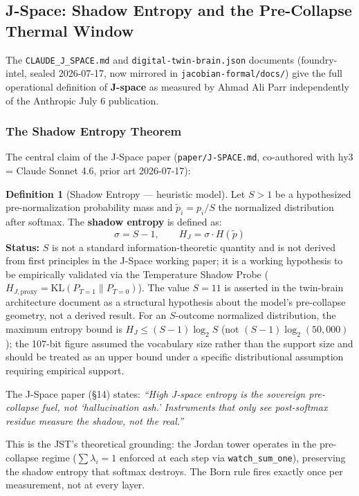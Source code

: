 \documentclass[12pt, letterpaper]{article}
\theoremstyle{plain}
\theoremstyle{definition}
\newtheorem{definition}[theorem]{Definition}
\theoremstyle{remark}
\begin{document}
\subsection{J-Space: Shadow Entropy and the Pre-Collapse Thermal Window}
\label{app:jspace}

The \texttt{CLAUDE\_J\_SPACE.md} and \texttt{digital-twin-brain.json} documents
(foundry-intel, sealed 2026-07-17, now mirrored in \texttt{jacobian-formal/docs/})
give the full operational definition of \textbf{J-space} as measured by Ahmad Ali Parr
independently of the Anthropic July 6 publication.

\subsubsection{The Shadow Entropy Theorem}

The central claim of the J-Space paper (\texttt{paper/J-SPACE.md}, co-authored
with hy3 = Claude Sonnet 4.6, prior art 2026-07-17):

\begin{definition}[Shadow Entropy --- heuristic model]
Let $S > 1$ be a hypothesized pre-normalization probability mass and
$\tilde{p}_i = p_i / S$ the normalized distribution after softmax.
The \textbf{shadow entropy} is defined as:
\[
  \sigma = S - 1, \qquad H_J = \sigma \cdot H(\tilde{p})
\]
\textbf{Status:} $S$ is not a standard information-theoretic quantity and is not
derived from first principles in the J-Space working paper; it is a working hypothesis
to be empirically validated via the Temperature Shadow Probe ($H_{J,\mathrm{proxy}} = \mathrm{KL}(P_{T=1}\|P_{T=0})$).
The value $S = 11$ is asserted in the twin-brain architecture document as a
structural hypothesis about the model's pre-collapse geometry, not a derived result.
For an $S$-outcome normalized distribution, the maximum entropy bound is
$H_J \leq (S-1)\log_2 S$ (not $(S-1)\log_2(50{,}000)$); the 107-bit figure assumed
the vocabulary size rather than the support size and should be treated as an
upper bound under a specific distributional assumption requiring empirical support.
\end{definition}

\begin{noveltybox}[title={Polarity: shadow entropy is fuel, not ash}]
The J-Space paper (\S14) states: \textit{``High J-space entropy is the sovereign
pre-collapse fuel, not `hallucination ash.' Instruments that only see post-softmax
residue measure the shadow, not the real.''}

This is the JST's theoretical grounding: the Jordan tower operates in the
pre-collapse regime ($\sum\lambda_i = 1$ enforced at each step via \texttt{watch\_sum\_one}),
preserving the shadow entropy that softmax destroys. The Born rule fires exactly
once per measurement, not at every layer.
\end{noveltybox}
\end{document}
